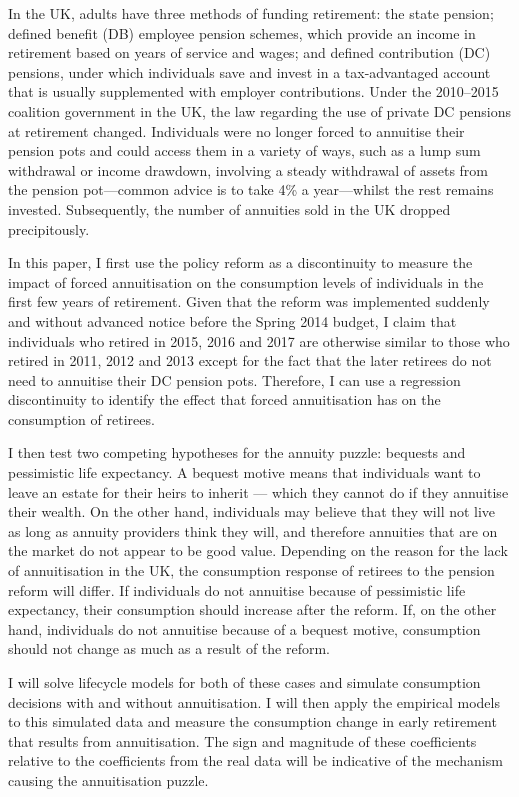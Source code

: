 \documentclass[12pt]{article}
\begin{document}
In the UK, adults have three methods of funding retirement: the state pension;
defined benefit (DB) employee pension schemes, which provide an income in
retirement based on years of service and wages; and defined
contribution (DC) pensions, under which individuals save and invest in a
tax-advantaged account that is usually supplemented with employer contributions.
Under the 2010--2015 coalition government in the UK, the law regarding the use of
private DC pensions at retirement changed. Individuals were no longer forced to
annuitise their pension pots and could access them in a variety of ways, such as
a lump sum withdrawal or income drawdown, involving a steady withdrawal of
assets from the pension pot---common advice is to take 4\% a year---whilst the
rest remains invested. Subsequently, the number of annuities sold in the UK
dropped precipitously.

In this paper, I first use the policy reform as a discontinuity to measure the
impact of forced annuitisation on the consumption levels of individuals in the
first few years of retirement. Given that the reform was implemented suddenly
and without advanced notice before the Spring 2014 budget, I claim that
individuals who retired in 2015, 2016 and 2017 are otherwise similar to those
who retired in 2011, 2012 and 2013 except for the fact that the later retirees
do not need to annuitise their DC pension pots. Therefore, I can use a
regression discontinuity to identify the effect that forced annuitisation has on
the consumption of retirees.

I then test two competing hypotheses for the annuity puzzle: bequests and
pessimistic life expectancy. A bequest motive means that individuals want to
leave an estate for their heirs to inherit --- which they cannot do if they
annuitise their wealth. On the other hand, individuals may believe that they
will not live as long as annuity providers think they will, and therefore
annuities that are on the market do not appear to be good value. Depending on
the reason for the lack of annuitisation in the UK, the consumption response of
retirees to the pension reform will differ. If individuals do not annuitise
because of pessimistic life expectancy, their consumption should increase after
the reform. If, on the other hand, individuals do not annuitise because of a
bequest motive, consumption should not change as much as a result of the reform.

I will solve lifecycle models for both of these cases and simulate consumption
decisions with and without annuitisation. I will then apply the empirical models
to this simulated data and measure the consumption change in early retirement
that results from annuitisation. The sign and magnitude of these coefficients
relative to the coefficients from the real data will be indicative of the
mechanism causing the annuitisation puzzle.
\end{document}
